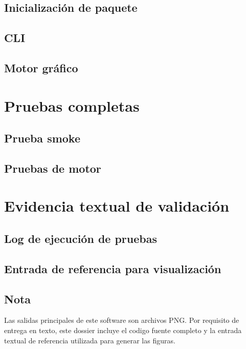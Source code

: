 \documentclass[11pt]{article}
\begin{document}
\subsection{Inicialización de paquete}
\subsection{CLI}
\subsection{Motor gráfico}

\section{Pruebas completas}
\subsection{Prueba smoke}
\subsection{Pruebas de motor}

\section{Evidencia textual de validación}
\subsection{Log de ejecución de pruebas}
\subsection{Entrada de referencia para visualización}
\subsection{Nota}
Las salidas principales de este software son archivos PNG. Por requisito de entrega en texto,
este dossier incluye el codigo fuente completo y la entrada textual de referencia utilizada para generar las figuras.
\end{document}
